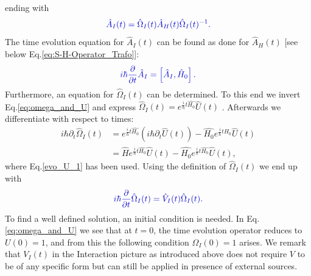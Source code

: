 \documentclass[12pt, titlepage]{article}
\begin{document}
ending with
\begin{equation}\label{eq:operator_interac_heisenberg}
\textcolor[RGB]{0,0,204}{
	\hat{A}_{I}(t)
	=
	\hat{\Omega}_{I}(t)
	\hat{A}_{H}(t)
	\hat{\Omega}_{I}(t)^{-1}
	.
}
\end{equation}
The time evolution equation for $ 	\hat{A}_{I}(t) $ can be found as done for $ \hat{A}_{H}(t) $ $ [ $see below Eq.\enskip\eqref{eq:S-H-Operator_Trafo}]:
\begin{equation}\label{eq:time_evo_equ_Intera}
\textcolor[RGB]{0,0,204}{
	i\hbar
	\frac{\partial}{\partial t}
	\hat{A}_{I}
	=
	\left[ 
	\hat{A}_{I},
	\hat{H}_{0}
	\right] .
}
\end{equation}
Furthermore, an equation for $ \hat{\Omega}_{I}(t) $ can be determined. To this end we invert Eq.\enskip\eqref{eq:omega_and_U} and express $  \hat{\Omega}_{I}(t) 
  		= e^{\frac{i}{\hbar}t \hat{H_{0}}}
			\hat{U}(t)  $ . Afterwards we differentiate with respect to times: 
\begin{subequations}
\begin{align}
  		i\hbar\partial_{t}\hat{\Omega}_{I}(t) 
  		 &= 
  		 e^{\frac{i}{\hbar}t\hat{H_{0}}}
  		 \left(i\hbar\partial_{t}\hat{U}(t) \right)
  		 -
  		 \hat{H_{0}}
   		 e^{\frac{i}{\hbar}t\hat{H_{0}}}
 		 \hat{U}(t)
  		 \\
  		 &=
  		 \hat{H}
  		  e^{\frac{i}{\hbar}t\hat{H_{0}}}  		 
  		 \hat{U}(t)  		 
  		 -
  		 \hat{H_{0}}
  		   e^{\frac{i}{\hbar}t\hat{H_{0}}}
  		 \hat{U}(t),
\end{align}
\end{subequations}
where Eq.\enskip\eqref{evo_U_1} has been used. Using the definition of $ \hat{\Omega}_{I}(t) $ we end up with
\begin{equation}\label{eq:time_evo_Omega_interaction}
\textcolor[RGB]{0,0,204}{
	i\hbar
	\frac{\partial}{\partial t}
	\hat{\Omega}_{I}(t)
	=
	\hat{V}_{I}(t)
	\hat{\Omega}_{I}(t)
.}
\end{equation}
To find a well defined solution, an initial condition is needed. In Eq.\enskip\eqref{eq:omega_and_U} we see that at $ t=0 $, the time evolution operator reduces to $ U(0)=1 $, and from this the following condition $ \Omega_{I}(0) = 1 $ arises.
We remark that $ V_{I}(t) $ in the Interaction picture as introduced above does not require $ V $ to be of any specific form but can still be applied in presence of external sources. 
\end{document}
